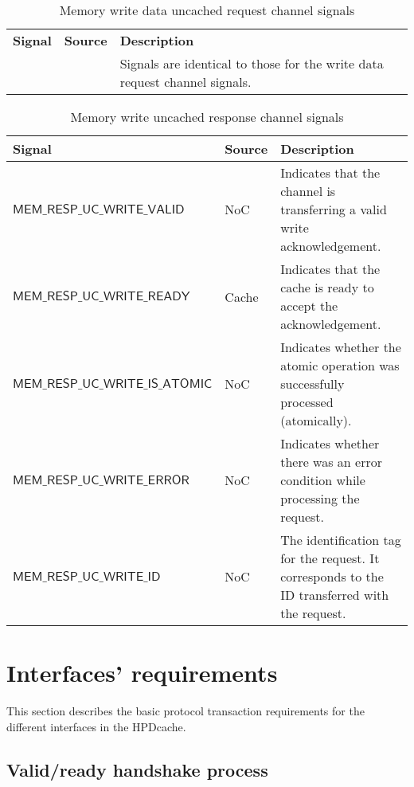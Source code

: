 \documentclass[10pt,titlepage,twoside]{book}
\begin{document}
\begin{table}[h!]
\caption{Memory write data uncached request channel signals}%
{\footnotesize%
\begin{tabular}{p{.38\linewidth}p{.07\linewidth}p{.55\linewidth}}
  \toprule
  \textbf{Signal}
  & \textbf{Source}
  & \textbf{Description} \\
  & & Signals are identical to those for the write data request channel signals.
\end{tabular}}
\end{table}

\begin{table}[h!]
\caption{Memory write uncached response channel signals}%
{\footnotesize%
\begin{tabular}{p{.38\linewidth}p{.07\linewidth}p{.55\linewidth}}
  \toprule
  \textbf{Signal}
  & \textbf{Source}
  & \textbf{Description} \\
  \midrule
  $\mathsf{MEM\_RESP\_UC\_WRITE\_VALID}$
  & NoC
  & Indicates that the channel is transferring a valid write acknowledgement.\\
  \midrule
  $\mathsf{MEM\_RESP\_UC\_WRITE\_READY}$
  & Cache
  & Indicates that the cache is ready to accept the acknowledgement.\\
  \midrule
  $\mathsf{MEM\_RESP\_UC\_WRITE\_IS\_ATOMIC}$
  & NoC
  & Indicates whether the atomic operation was successfully processed (atomically).\\
  \midrule
  $\mathsf{MEM\_RESP\_UC\_WRITE\_ERROR}$
  & NoC
  & Indicates whether there was an error condition while processing the request.\\
  \midrule
  $\mathsf{MEM\_RESP\_UC\_WRITE\_ID}$
  & NoC
  & The identification tag for the request.
  It corresponds to the ID transferred with the request.\\
\end{tabular}}
\end{table}

\section{Interfaces' requirements}

This section describes the basic protocol transaction requirements for the different interfaces in the \ac{HPDcache}.

\subsection{Valid/ready handshake process}%
\end{document}
